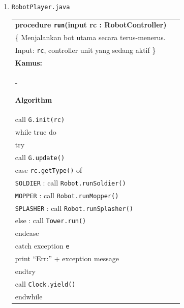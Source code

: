 \documentclass{article}
\newenvironment{pseudobox}
{
\centering
\begin{longtable}{|p{0.94\linewidth}|}
\hline
}
{
\\ \hline
\end{longtable}
\vspace{0.05cm}
}
\begin{document}
\begin{enumerate}[label=\alph*.]
\begin{enumerate}[label=\alph*.]

\item \texttt{RobotPlayer.java}

\begin{pseudobox}
\textbf{procedure \texttt{run}(input rc : RobotController)} \\
\{ Menjalankan bot utama secara terus-menerus. \\
Input: \texttt{rc}, controller unit yang sedang aktif
\}\\

\textbf{Kamus:} \\
\hspace*{1.5em}-

\textbf{Algorithm} \\
\hspace*{1.5em}call \texttt{G.init(rc)} \\
\hspace*{1.5em}while true do \\
\hspace*{3em}try \\
\hspace*{4.5em}call \texttt{G.update()} \\
\hspace*{4.5em}case \texttt{rc.getType()} of \\
\hspace*{6em}\texttt{SOLDIER}  : call \texttt{Robot.runSoldier()} \\
\hspace*{6em}\texttt{MOPPER}   : call \texttt{Robot.runMopper()} \\
\hspace*{6em}\texttt{SPLASHER} : call \texttt{Robot.runSplasher()} \\
\hspace*{6em}else             : call \texttt{Tower.run()} \\
\hspace*{4.5em}endcase \\
\hspace*{3em}catch exception \texttt{e} \\
\hspace*{4.5em}print ``Err:'' + exception message \\
\hspace*{3em}endtry \\
\hspace*{3em}call \texttt{Clock.yield()}  \\
\hspace*{1.5em}endwhile
\end{pseudobox}


\end{enumerate}
\end{enumerate}
\end{document}
